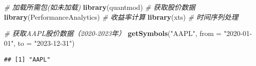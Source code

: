 \documentclass[]{ctexbook}
\newenvironment{Shaded}{\begin{snugshade}}{\end{snugshade}}
\newcommand{\AttributeTok}[1]{\textcolor[rgb]{0.13,0.29,0.53}{#1}}
\newcommand{\CommentTok}[1]{\textcolor[rgb]{0.56,0.35,0.01}{\textit{#1}}}
\newcommand{\FunctionTok}[1]{\textcolor[rgb]{0.13,0.29,0.53}{\textbf{#1}}}
\newcommand{\NormalTok}[1]{#1}
\newcommand{\StringTok}[1]{\textcolor[rgb]{0.31,0.60,0.02}{#1}}
\begin{document}
\begin{Shaded}
\begin{Highlighting}[]
\CommentTok{\# 加载所需包(如未加载)}
\FunctionTok{library}\NormalTok{(quantmod)      }\CommentTok{\# 获取股价数据}
\FunctionTok{library}\NormalTok{(PerformanceAnalytics) }\CommentTok{\# 收益率计算}
\FunctionTok{library}\NormalTok{(xts)           }\CommentTok{\# 时间序列处理}

\CommentTok{\# 获取AAPL股价数据（2020{-}2023年）}
\FunctionTok{getSymbols}\NormalTok{(}\StringTok{"AAPL"}\NormalTok{, }\AttributeTok{from =} \StringTok{"2020{-}01{-}01"}\NormalTok{, }\AttributeTok{to =} \StringTok{"2023{-}12{-}31"}\NormalTok{)}
\end{Highlighting}
\end{Shaded}

\begin{verbatim}
## [1] "AAPL"
\end{verbatim}
\end{document}
